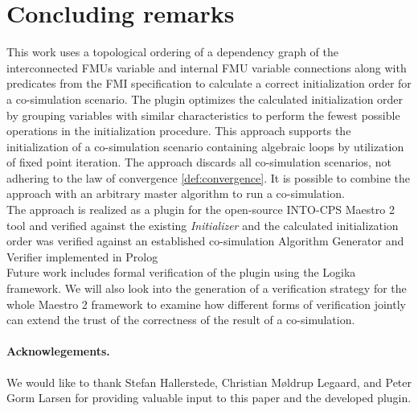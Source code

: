 \section{Concluding remarks}\label{sc:summary}
This work uses a topological ordering of a dependency graph of the interconnected FMUs variable and internal FMU variable connections along with predicates from the FMI specification to calculate a correct initialization order for a co-simulation scenario. The plugin optimizes the calculated initialization order by grouping variables with similar characteristics to perform the fewest possible operations in the initialization procedure.
This approach supports the initialization of a co-simulation scenario containing algebraic loops by utilization of fixed point iteration. The approach discards all co-simulation scenarios, not adhering to the law of convergence \ref{def:convergence}.
It is possible to combine the approach with an arbitrary master algorithm to run a co-simulation. \\
The approach is realized as a plugin for the open-source INTO-CPS Maestro 2 tool and verified against the existing \textit{Initializer} and the calculated initialization order was verified against an established co-simulation Algorithm Generator and Verifier implemented in Prolog\cite{gomes_lucio_vangheluwe_2019}\\
Future work includes formal verification of the plugin using the Logika framework\cite{inbook}.
We will also look into the generation of a verification strategy for the whole Maestro 2 framework to examine how different forms of verification jointly can extend the trust of the correctness of the result of a co-simulation. 

\paragraph*{\textbf{Acknowlegements.}}We would like to thank Stefan Hallerstede, Christian Møldrup Legaard, and Peter Gorm Larsen for providing valuable input to this paper and the developed plugin.